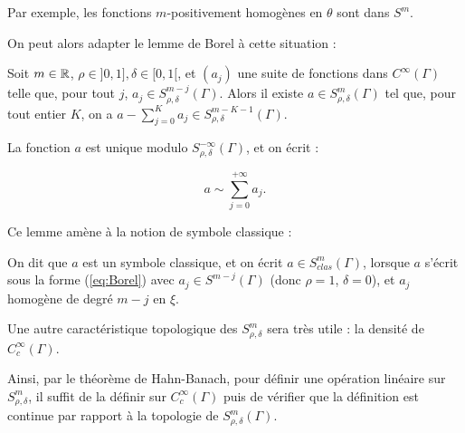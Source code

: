 Par exemple, les fonctions $m$-positivement homogènes en $\theta$ sont dans $S^m$.

On peut alors adapter le lemme de Borel à cette situation :

\begin{lem}\label{lem:Borel}
	Soit $m \in \mathbb{R}$, $\rho\in ]0,1], \delta \in [0,1[$, et $(a_j)$ une suite de fonctions dans $C^{\infty}(\Gamma)$ telle que, pour tout $j$, $a_j \in S^{m-j}_{\rho, \delta}(\Gamma)$. Alors il existe $a\in S^{m}_{\rho, \delta}(\Gamma)$ tel que, pour tout entier $K$, on a $a - \sum_{j=0}^Ka_j \in S^{m-K-1}_{\rho, \delta}(\Gamma)$.
	
	La fonction $a$ est unique modulo $S^{-\infty}_{\rho, \delta}(\Gamma)$, et on écrit :
	
	\begin{equation}
	\label{eq:Borel}
	a \sim \sum_{j=0}^{+\infty}a_j.
	\end{equation}
\end{lem}

Ce lemme amène à la notion de symbole classique :

\begin{defn}
	On dit que $a$ est un symbole classique, et on écrit $a \in S^m_{clas}(\Gamma)$, lorsque $a$ s'écrit sous la forme (\ref{eq:Borel}) avec $a_j \in S^{m-j}(\Gamma)$ (donc $\rho = 1$, $\delta = 0$), et $a_j$ homogène de degré $m-j$ en $\xi$.
\end{defn}

Une autre caractéristique topologique des $S^m_{\rho, \delta}$ sera très utile : la densité de $C^{\infty}_c(\Gamma)$.

Ainsi, par le théorème de Hahn-Banach, pour définir une opération linéaire sur $S^m_{\rho, \delta}$, il suffit de la définir sur $C^{\infty}_c(\Gamma)$ puis de vérifier que la définition est continue par rapport à la topologie de $S^m_{\rho, \delta}(\Gamma)$.

